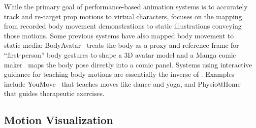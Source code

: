 While the primary goal of performance-based animation systems is to accurately track and re-target prop motions to virtual characters, \systemname{} focuses on the mapping from recorded body movement demonstrations to static illustrations conveying those motions.
Some previous systems have also mapped body movement to static media:
BodyAvatar~\cite{Zhang:2013:BodyAvatar} treats the body as a proxy and reference frame for ``first-person'' body gestures to shape a 3D avatar model and
a Manga comic maker~\cite{lumb_manga_2013} maps the body pose directly into a comic panel.
Systems using interactive guidance for teaching body motions are essentially the inverse of \systemname{}. Examples include YouMove~\cite{Anderson:2013} that teaches moves like dance and yoga, and Physio@Home~\cite{Tang:2014:Physio@Home} that guides therapeutic exercises.
%
%





\subsection{Motion Visualization}

